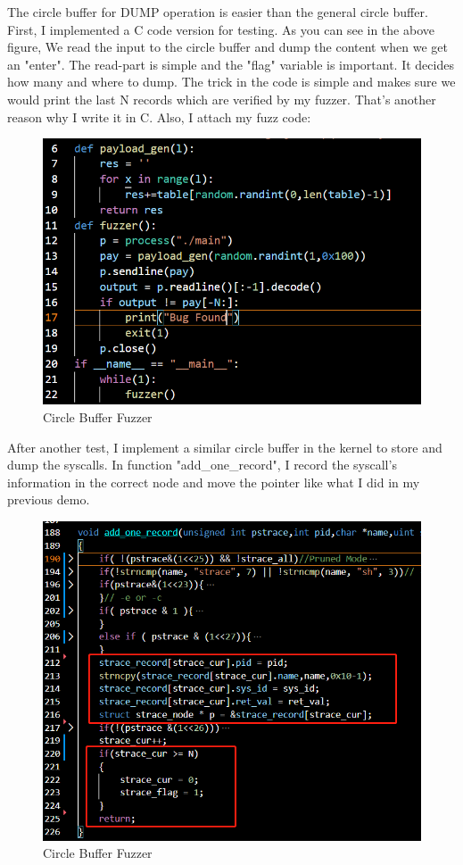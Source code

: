 \documentclass[11pt,oneside,a4paper]{article}
\begin{document}
The circle buffer for DUMP operation is easier than the general circle buffer. First, I 
implemented a C code version for testing. As you can see in the above figure, 
We read the input to the circle buffer and dump the content when we get an "enter".
The read-part is simple and the "flag" variable is important. It decides how many
and where to dump. The trick in the code is simple and makes sure we would print the
last N records which are verified by my fuzzer. That's another reason why I write it 
in C. Also, I attach my fuzz code:

\begin{figure}[H]
    \includegraphics[width=4.75in]{1-10.png}
    \centering
    \caption{Circle Buffer Fuzzer}
\end{figure}

After another test, I implement a similar circle buffer in the kernel to store and 
dump the syscalls. In function "add\_one\_record", I record the syscall's information in 
the correct node and move the pointer like what I did in my previous demo. 

\begin{figure}[H]
    \includegraphics[width=4.75in]{1-11.png}
    \centering
    \caption{Circle Buffer Fuzzer}
\end{figure}
\end{document}
